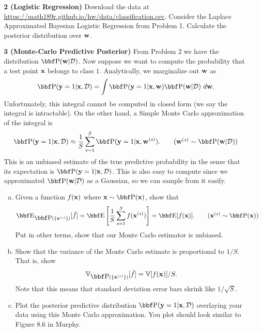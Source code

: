 \documentclass[12pt,letterpaper,fleqn]{hmcpset}
\begin{document}
\newpage

\textbf{2 (Logistic Regression)} Download the data at
\url{https://math189r.github.io/hw/data/classification.csv}. Consider the Laplace Approximated
Bayesian Logistic Regression from Problem 1. Calculate the posterior distribution
over ${\bf w}$.

\textbf{3 (Monte-Carlo Predictive Posterior)} From Problem 2 we have the distribution
$\PP(\ww|\Dc)$. Now suppose we want to compute the probability that a test point ${\bf x}$
belongs to class $1$. Analytically, we marginalize out ${\bf w}$ as
\[
    \PP(\yy=1|\xx,\Dc) = \int \PP(\yy=1|\xx,\ww)\PP(\ww|\Dc)~d\ww.
\]
Unfortunately, this integral cannot be computed in closed form (we say the integral is
intractable). On the other hand, a Simple Monte Carlo approximation of the integral is
\begin{align*}
    \PP(\yy=1|\xx,\Dc) \approx \frac{1}{S}\sum_{s=1}^S \PP(\yy=1|\xx,\ww^{(s)}).\tag{$\ww^{(s)}\sim\PP(\ww|\Dc)$}
\end{align*}
This is an unbiased estimate of the true predictive probability in the sense that its expectation
is $\PP(\yy=1|\xx,\Dc)$. This is also easy to compute since we approximated $\PP(\ww|\Dc)$ as
a Gaussian, so we can sample from it easily.
\begin{enumerate}[(a)]
    \item Given a function $f({\bf x})$ where $\xx\sim \PP(\xx)$, show that
        \begin{align*}
            \EE_{\PP(\{\xx^{(s)}\})}[\hat f] = \EE\left[\frac{1}{S}\sum_{s=1}^S f(\xx^{(s)})\right] = \EE[f(\xx)].\tag{$\xx^{(s)}\sim\PP(\xx)$}
        \end{align*}
        Put in other terms, show that our Monte Carlo estimator is unbiased.
    \item Show that the variance of the Monte Carlo estimate is proportional to
        $1/S$. That is, show
        \begin{align*}
            \mathbb{V}_{\PP(\{\xx^{(s)}\})}[\hat f] = \mathbb{V}[f(\xx)]/S.
        \end{align*}
        Note that this means that standard deviation error bars shrink like $1/\sqrt{S}$.
    \item Plot the posterior predictive distribution $\PP(\yy=1|\xx,\Dc)$ overlaying your data
        using this Monte Carlo approximation. You plot should look similar to Figure 8.6 in
        Murphy.
\end{enumerate}
\end{document}
